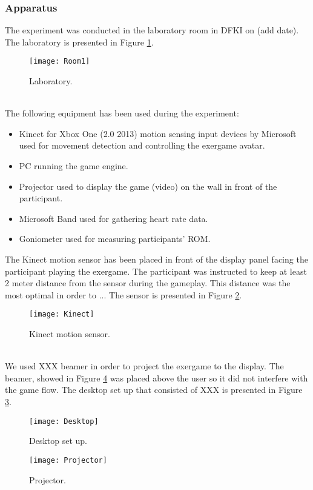 \subsubsection{Apparatus}
The experiment was conducted in the laboratory room in DFKI on (add date). The laboratory is presented in Figure \ref{fig:lab1}.\\ 
\begin{figure}[h]
    \centering
    \texttt{[image: Room1]}
    \caption{Laboratory.}
    \label{fig:lab1}
\end{figure}\\
The following equipment has been used during the experiment:
\begin{itemize}
\item Kinect for Xbox One (2.0 2013) motion sensing input devices by Microsoft used for movement detection and controlling the exergame avatar. 
\item PC running the game engine.
\item Projector used to display the game (video) on the wall in front of the participant.
\item Microsoft Band used for gathering heart rate data.
\item Goniometer used for measuring participants' ROM.
\end{itemize}\pagebreak
The Kinect motion sensor has been placed in front of the display panel facing the participant playing the exergame. The participant was instructed to keep at least 2 meter distance from the sensor during the gameplay. This distance was the most optimal in order to ... The sensor is presented in Figure \ref{fig:kinect}.\\
\begin{figure}[h]
    \centering
    \texttt{[image: Kinect]}
    \caption{Kinect motion sensor.}
    \label{fig:kinect}
\end{figure}\\
We used XXX beamer in order to project the exergame to the display. The beamer, showed in Figure \ref{fig:projector} was placed above the user so it did not interfere with the game flow. The desktop set up that consisted of XXX is presented in Figure \ref{fig:desktop}.\\
\begin{figure}[h]
    \centering
    \texttt{[image: Desktop]}
    \caption{Desktop set up.}
    \label{fig:desktop}
\end{figure}
\begin{figure}[h]
    \centering
    \texttt{[image: Projector]}
    \caption{Projector.}
    \label{fig:projector}
\end{figure}
